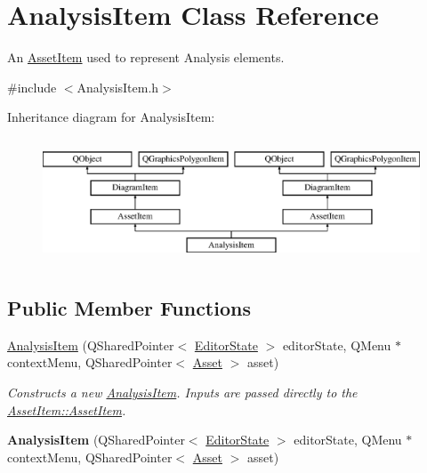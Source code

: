 \hypertarget{class_analysis_item}{\section{Analysis\-Item Class Reference}
\label{class_analysis_item}
}


An \hyperlink{class_asset_item}{Asset\-Item} used to represent Analysis elements.  




{\ttfamily \#include $<$Analysis\-Item.\-h$>$}

Inheritance diagram for Analysis\-Item\-:\begin{figure}[H]
\begin{center}
\leavevmode
\includegraphics[height=3.758389cm]{class_analysis_item}
\end{center}
\end{figure}
\subsection*{Public Member Functions}
\begin{DoxyCompactItemize}
\item 
\hypertarget{class_analysis_item_af186678c1d6b6d571830e2cbc7f47ddc}{\hyperlink{class_analysis_item_af186678c1d6b6d571830e2cbc7f47ddc}{Analysis\-Item} (Q\-Shared\-Pointer$<$ \hyperlink{class_editor_state}{Editor\-State} $>$ editor\-State, Q\-Menu $\ast$context\-Menu, Q\-Shared\-Pointer$<$ \hyperlink{class_picto_1_1_asset}{Asset} $>$ asset)}\label{class_analysis_item_af186678c1d6b6d571830e2cbc7f47ddc}

\begin{DoxyCompactList}\small\item\em Constructs a new \hyperlink{class_analysis_item}{Analysis\-Item}. Inputs are passed directly to the \hyperlink{class_asset_item_a3a906a41b88bfa28ba3ac56c66004713}{Asset\-Item\-::\-Asset\-Item}. \end{DoxyCompactList}\item 
\hypertarget{class_analysis_item_af186678c1d6b6d571830e2cbc7f47ddc}{{\bfseries Analysis\-Item} (Q\-Shared\-Pointer$<$ \hyperlink{class_editor_state}{Editor\-State} $>$ editor\-State, Q\-Menu $\ast$context\-Menu, Q\-Shared\-Pointer$<$ \hyperlink{class_picto_1_1_asset}{Asset} $>$ asset)}\label{class_analysis_item_af186678c1d6b6d571830e2cbc7f47ddc}

\end{DoxyCompactItemize}
